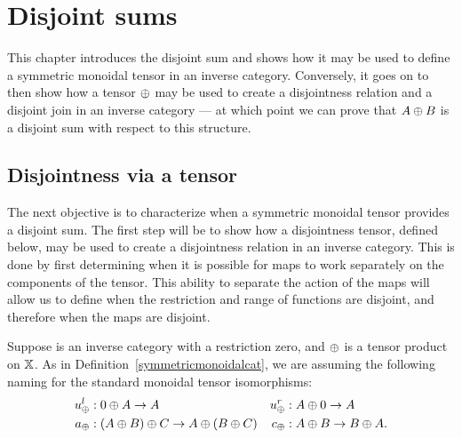 \chapter{Disjoint sums} %
\label{chap:disjoint_sum_tensors}

This chapter introduces the disjoint sum and shows how it may be used to define a symmetric monoidal
tensor in an inverse category. Conversely, it goes on to then show how a tensor $\oplus$ may be used to
create a disjointness relation and a disjoint join in an inverse category  --- at which point we can
prove that $A\oplus B$ is a disjoint sum with respect to this structure.





\section{Disjointness via a tensor}
\label{sec:disjointness_via_a_tensor}

The next objective is to characterize when a symmetric monoidal tensor provides a disjoint sum. The
first step will be to show how a disjointness tensor, defined below, may be used to create a
disjointness relation in an inverse category. This is done by first determining when it is possible
for maps to work separately on the components of the tensor. This ability to separate the action of
the maps will allow us to define when the restriction and range of functions are disjoint, and
therefore when the maps are disjoint.

Suppose \X is an inverse category  with a restriction zero, and $\oplus$ is a tensor product on $\mathbb{X}$.
As in Definition~\ref{symmetricmonoidalcat}, we are assuming the following naming for the standard
monoidal tensor isomorphisms:
\begin{align*}
  u_{\oplus}^l &: 0 \oplus A \to A &
  u_{\oplus}^r &: A \oplus 0 \to A\\
  a_\oplus &: (A \oplus B) \oplus C \to A \oplus (B \oplus C) &
  c_\oplus &: A \oplus B \to B \oplus A.
\end{align*}

